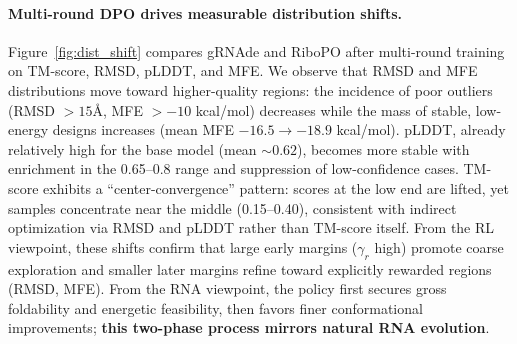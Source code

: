 \paragraph{Multi-round DPO drives measurable distribution shifts.}
Figure~\ref{fig:dist_shift} compares gRNAde and RiboPO after multi-round training on TM-score, RMSD, pLDDT, and MFE. We observe that RMSD and MFE distributions move toward higher-quality regions: the incidence of poor outliers (RMSD $>15$\AA, MFE $>-10$ kcal/mol) decreases while the mass of stable, low-energy designs increases (mean MFE $-16.5\rightarrow-18.9$ kcal/mol). pLDDT, already relatively high for the base model (mean $\sim 0.62$), becomes more stable with enrichment in the 0.65–0.8 range and suppression of low-confidence cases. TM-score exhibits a “center-convergence” pattern: scores at the low end are lifted, yet samples concentrate near the middle (0.15–0.40), consistent with indirect optimization via RMSD and pLDDT rather than TM-score itself. From the RL viewpoint, these shifts confirm that large early margins ($\gamma_r$ high) promote coarse exploration and smaller later margins refine toward explicitly rewarded regions (RMSD, MFE). From the RNA viewpoint, the policy first secures gross foldability and energetic feasibility, then favors finer conformational improvements; \textbf{this two-phase process mirrors natural RNA evolution}.


